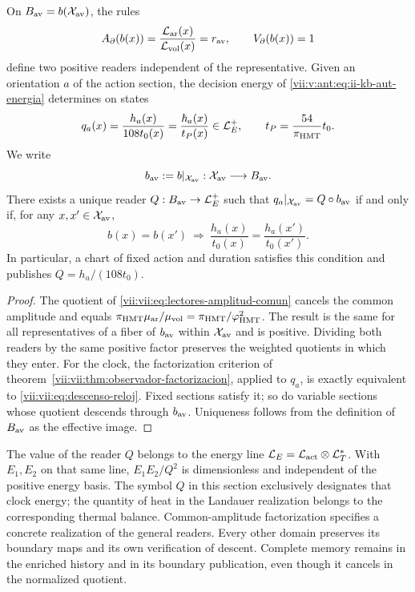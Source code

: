 \begin{proposition}
\label{vii:vii:prop:lectores-frontera-explicitos}
On \(B_{\rm av}=b(\mathcal X_{\rm av})\), the rules
\begin{equation}
 A_\partial(b(x))
 =\frac{\mathcal L_{\rm ar}(x)}{\mathcal L_{\rm vol}(x)}
 =r_{\rm av},\qquad V_\partial(b(x))=1
 \label{vii:vii:eq:lectores-normalizados}
\end{equation}
define two positive readers independent of the representative.
Given an orientation \(a\) of the action section, the decision
energy of \eqref{vii:v:ant:eq:ii-kb-aut-energia} determines on states
\begin{equation}
 q_a(x)=\frac{h_a(x)}{108t_0(x)}
       =\frac{\hbar_a(x)}{t_P(x)}\in\mathcal L_E^+,
 \qquad t_P=\frac{54}{\pi_{\rm HMT}}t_0.
 \label{vii:vii:eq:lector-q-accion}
\end{equation}
We write
\[
 b_{\rm av}:=b|_{\mathcal X_{\rm av}}:
 \mathcal X_{\rm av}\longrightarrow B_{\rm av}.
\]
There exists a unique reader \(Q:B_{\rm av}\to\mathcal L_E^+\) such that
\(q_a|_{\mathcal X_{\rm av}}=Q\circ b_{\rm av}\)
if and only if, for any \(x,x'\in\mathcal X_{\rm av}\),
\begin{equation}
 b(x)=b(x')\ \Longrightarrow\
 \frac{h_a(x)}{t_0(x)}=\frac{h_a(x')}{t_0(x')}.
 \label{vii:vii:eq:descenso-reloj}
\end{equation}
In particular, a chart of fixed action and duration satisfies this
condition and publishes \(Q=h_a/(108t_0)\).
\end{proposition}
\begin{proof}
The quotient of \eqref{vii:vii:eq:lectores-amplitud-comun} cancels the
common amplitude and equals
\(\pi_{\rm HMT}\mu_{\rm ar}/\mu_{\rm vol}
=\pi_{\rm HMT}/\varphi_{\rm HMT}^2\).
The result is the same for all representatives of a fiber
of \(b_{\rm av}\) within \(\mathcal X_{\rm av}\) and is positive.
Dividing both readers by the same positive factor
preserves the weighted quotients in which they enter.
For the clock, the factorization criterion of
theorem~\ref{vii:vii:thm:observador-factorizacion}, applied to \(q_a\),
is exactly equivalent to \eqref{vii:vii:eq:descenso-reloj}. Fixed sections
satisfy it; so do variable sections whose
quotient descends through \(b_{\rm av}\). Uniqueness follows from the definition
of \(B_{\rm av}\) as the effective image.
\end{proof}

The value of the reader \(Q\) belongs to the energy line
\(\mathcal L_E=\mathcal L_{\rm act}\otimes\mathcal L_T^*\).
With \(E_1,E_2\) on that same line,
\(E_1E_2/Q^2\) is dimensionless and independent of the positive energy
basis. The symbol \(Q\) in this section exclusively designates
that clock energy; the quantity of heat in the Landauer
realization belongs to the corresponding thermal balance.
Common-amplitude factorization specifies a concrete
realization of the general readers. Every other domain preserves its
boundary maps and its own verification of descent.
Complete memory remains in the enriched history and in its
boundary publication, even though it cancels in the normalized quotient.


